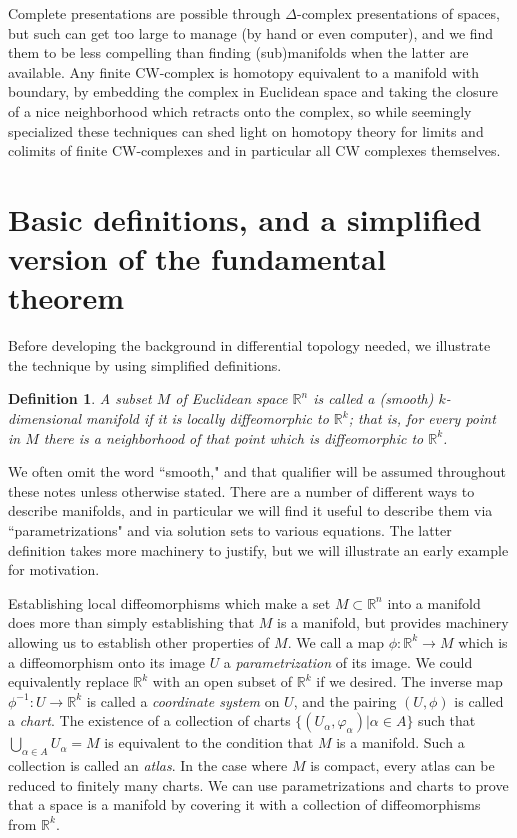 \documentclass{amsart}          %
\newtheorem{definition}[theorem]{Definition}
\newcommand{\R}{\mathbb R}
\begin{document}
Complete presentations are possible through $\Delta$-complex
presentations of spaces, but such can get too large to manage (by hand or even computer), and we find them  to be less compelling
than finding (sub)manifolds when the latter are available.  
Any finite CW-complex is homotopy equivalent to a manifold with boundary, by  embedding the complex in Euclidean space
and taking the closure of a nice neighborhood which retracts onto the complex, so while seemingly specialized these techniques
can shed light on homotopy theory for limits and colimits of finite CW-complexes and in particular all CW complexes themselves.\newpage

\tableofcontents
\newpage

\section{Basic definitions, and a simplified version of the fundamental theorem}

Before developing the background in differential topology needed, we illustrate the technique by using simplified definitions.

\begin{definition}

	A subset $M$ of Euclidean space $\R^n$ is called a (smooth) $k$-dimensional manifold if it is locally diffeomorphic to $\R^k$; that is, for every point in $M$ there is a neighborhood of that point which is diffeomorphic to $\R^k$.  
\end{definition}

We often omit the word ``smooth," and that qualifier will be assumed throughout these notes unless otherwise stated. There are a number of different ways to describe manifolds, and in particular we will find it useful to describe them via ``parametrizations" and via solution sets to various equations. The latter definition takes more machinery to justify, but we will illustrate an early example for motivation.

Establishing local diffeomorphisms which make a set $M\subset \R^n$ into a manifold does more than simply establishing that $M$ is a manifold, but provides machinery allowing us to establish other properties of $M$. We call a map $\phi: \R^k \rightarrow M$ which is a diffeomorphism onto its image $U$ a \textit{parametrization} of its image. We could equivalently replace $\R^k$ with an open subset of $\R^k$ if we desired. The inverse map $\phi^{-1}:U\rightarrow \R^k$ is called a \textit{coordinate system} on $U$, and the pairing $(U, \phi)$ is called a \textit{chart}. The existence of a collection of charts $\{ (U_\alpha, \varphi_\alpha) | \alpha \in A\}$ such that $\bigcup_{\alpha\in A}U_\alpha = M$ is equivalent to the condition that $M$ is a manifold. Such a collection is called an \textit{atlas}. In the case where $M$ is compact, every atlas can be reduced to finitely many charts. We can use parametrizations and charts to prove that a space is a manifold by covering it with a collection of diffeomorphisms from $\R^k$.
\end{document}
